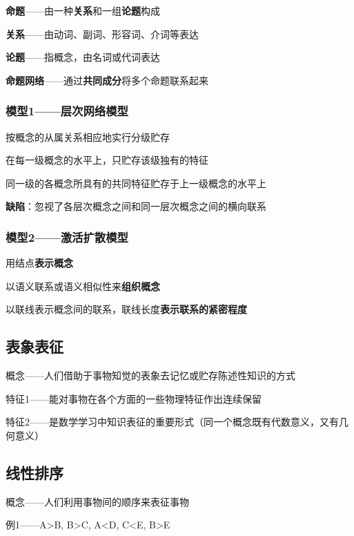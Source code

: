 \textbf{命题}——由一种\textbf{关系}和一组\textbf{论题}构成

\textbf{关系}——由动词、副词、形容词、介词等表达

\textbf{论题}——指概念，由名词或代词表达

\textbf{命题网络}——通过\textbf{共同成分}将多个命题联系起来


\begin{multicols}{2}

\subsubsection*{模型1——层次网络模型}

按概念的从属关系相应地实行分级贮存

在每一级概念的水平上，只贮存该级独有的特征

同一级的各概念所具有的共同特征贮存于上一级概念的水平上

\textbf{缺陷}：忽视了各层次概念之间和同一层次概念之间的横向联系

\columnbreak

\subsubsection*{模型2——激活扩散模型}

用结点\textbf{表示概念}

以语义联系或语义相似性来\textbf{组织概念}

以联线表示概念间的联系，联线长度\textbf{表示联系的紧密程度}

\end{multicols}


\subsection{表象表征}

概念——人们借助于事物知觉的表象去记忆或贮存陈述性知识的方式

特征1——能对事物在各个方面的一些物理特征作出连续保留

特征2——是数学学习中知识表征的重要形式（同一个概念既有代数意义，又有几何意义）

\subsection{线性排序}

概念——人们利用事物间的顺序来表征事物

例1——A>B, B>C, A<D, C<E, B>E

